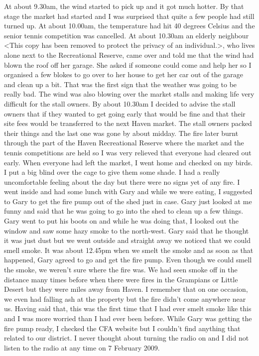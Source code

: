 \documentclass[a4paper]{article}
\begin{document}
    At about 9.30am, the wind started to pick up and it got much hotter. By that stage the market had started and I was surprised that quite a few people had still turned up. At about 10.00am, the temperature had hit 40 degrees Celsius and the senior tennis competition was cancelled. At about 10.30am an elderly neighbour <This copy has been removed to protect the privacy of an individual.>, who lives alone next to the Recreational Reserve, came over and told me that the wind had blown the roof off her garage. She asked if someone could come and help her so I organised a few blokes to go over to her house to get her car out of the garage and clean up a bit. That was the first sign that the weather was going to be really bad.
    The wind was also blowing over the market stalls and making life very difficult for the stall owners. By about 10.30am I decided to advise the stall owners that if they wanted to get going early that would be fine and that their site fees would be transferred to the next Haven market. The stall owners packed their things and the last one was gone by about midday. The fire later burnt through the part of the Haven Recreational Reserve where the market and the tennis competitions are held so I was very relieved that everyone had cleared out early.
    When everyone had left the market, I went home and checked on my birds. I put a big blind over the cage to give them some shade. I had a really uncomfortable feeling about the day but there were no signs yet of any fire. I went inside and had some lunch with Gary and while we were eating, I suggested to Gary to get the fire pump out of the shed just in case. Gary just looked at me funny and said that he was going to go into the shed to clean up a few things. Gary went to put his boots on and while he was doing that, I looked out the window and saw some hazy smoke to the north-west. Gary said that he thought it was just dust but we went outside and straight away we noticed that we could smell smoke. It was about 12.45pm when we smelt the smoke and as soon as that happened, Gary agreed to go and get the fire pump.
    Even though we could smell the smoke, we weren't sure where the fire was. We had seen smoke off in the distance many times before when there were fires in the Grampians or Little Desert but they were miles away from Haven. I remember that on one occasion, we even had falling ash at the property but the fire didn't come anywhere near us. Having said that, this was the first time that I had ever smelt smoke like this and I was more worried than I had ever been before. While Gary was getting the fire pump ready, I checked the CFA website but I couldn't find anything that related to our district. I never thought about turning the radio on and I did not listen to the radio at any time on 7 February 2009.
\end{document}
